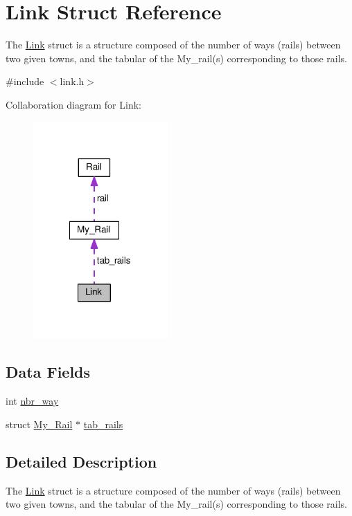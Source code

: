 \hypertarget{structLink}{\section{Link Struct Reference}
\label{structLink}
}


The \hyperlink{structLink}{Link} struct is a structure composed of the number of ways (rails) between two given towns, and the tabular of the My\-\_\-rail(s) corresponding to those rails.  




{\ttfamily \#include $<$link.\-h$>$}



Collaboration diagram for Link\-:
\nopagebreak
\begin{figure}[H]
\begin{center}
\leavevmode
\includegraphics[width=146pt]{structLink__coll__graph}
\end{center}
\end{figure}
\subsection*{Data Fields}
\begin{DoxyCompactItemize}
\item 
int \hyperlink{structLink_a40cf4e4cf21e1686e79e3996ad0f6193}{nbr\-\_\-way}
\item 
struct \hyperlink{structMy__Rail}{My\-\_\-\-Rail} $\ast$ \hyperlink{structLink_ade94502d272c9618b413007c70ee7c83}{tab\-\_\-rails}
\end{DoxyCompactItemize}


\subsection{Detailed Description}
The \hyperlink{structLink}{Link} struct is a structure composed of the number of ways (rails) between two given towns, and the tabular of the My\-\_\-rail(s) corresponding to those rails. 

